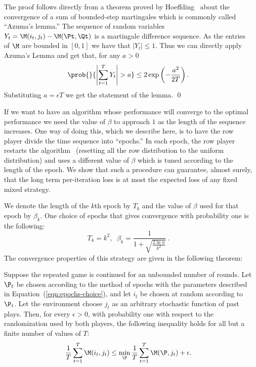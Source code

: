 \proof 
The proof follows directly from a theorem proved by
Hoeffding~\cite{Hoeffding63} about
the convergence of a sum of bounded-step martingales which is commonly
called ``Azuma's lemma.''
The sequence of random variables $Y_t = \M(i_t,j_t) - \M(\Pt,\Qt)$ is
a martingale difference sequence. As the entries of $\M$ are bounded
in $[0,1]$ we have that $|Y_t| \leq 1$. Thus we can directly apply
Azuma's Lemma and get that, for any $a>0$
\[
\prob{}{\left| \sum_{t=1}^TY_t \right| > a}
   \leq 
2\exp \left( -{a^2 \over 2T} \right).
\]
Substituting $a=\epsilon T$ we get the statement of the lemma.
\qed

If we want to have an algorithm whose performance will converge to the
optimal performance we need the value of $\beta$
to approach $1$ as the length of the sequence increases. One way of
doing this, which we describe here, is to have the row player 
divide the time sequence into ``epochs.''  In each epoch, the row player
restarts the algorithm \lwalg\ (resetting all the row distribution to
the uniform distribution) and uses a different value of $\beta$ 
which is tuned according to the length of the epoch. 
We show that such a procedure can guarantee, almost surely, that the 
long term per-iteration loss is at most the expected loss of any
fixed mixed strategy.

\newcommand{\k}{k}
We denote the length of the $\k$th epoch
by $T_{\k}$ and the value of $\beta$ used for that epoch by $\beta_{\k}$.
One choice of epochs that gives convergence with probability one is
the following:
\begin{equation} \label{eqn:epochs-choice}
T_{\k} = \k^2,\;\;
\beta_{\k}=\frac{1}{1+\sqrt{\frac{2 \ln n}{\k^2}}}~.
\end{equation}
The convergence properties of this strategy are given in the following theorem:

\begin{theorem} \label{thm:prob1conv}
Suppose the repeated game is continued for an unbounded number of
rounds.
Let $\P_t$ be chosen according to the method of
epochs with the parameters described in
Equation~(\ref{eqn:epochs-choice}),
and let $i_t$ be chosen at random according to $\P_t$.
Let the environment choose $j_t$ as an arbitrary stochastic function
of past plays.
Then, for every $\epsilon>0$,
with
probability one with respect to the randomization used by both players, the
following inequality holds for all but a finite number of values of $T$:
\[
{1 \over T} \sum_{t=1}^T \M(i_t,j_t)
\leq \minp {1 \over T} \sum_{t=1}^T \M(\P,j_t)
+ \epsilon.
\]
\end{theorem}


